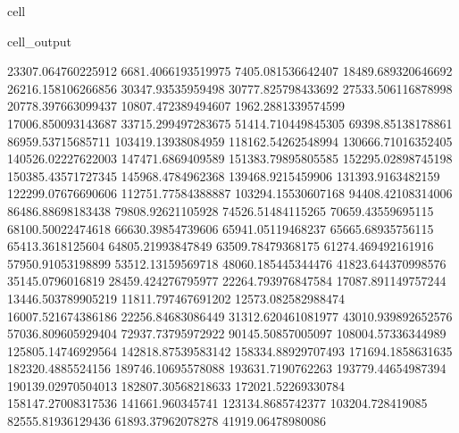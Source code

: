 \documentclass[letterpaper,10pt,english]{jupyterBook}
\begin{document}
\begin{sphinxuseclass}{cell}
\begin{sphinxVerbatimOutput}
\begin{sphinxuseclass}{cell_output}
\begin{sphinxVerbatim}[commandchars=\\\{\}]
23307.064760225912  6681.4066193519975  \PYGZhy{}7405.081536642407  \PYGZhy{}18489.689320646692  \PYGZhy{}26216.158106266856  \PYGZhy{}30347.93535959498  \PYGZhy{}30777.825798433692  \PYGZhy{}27533.506116878998  \PYGZhy{}20778.397663099437  \PYGZhy{}10807.472389494607  1962.2881339574599  17006.850093143687  33715.299497283675  51414.710449845305  69398.85138178861  86959.53715685711  103419.13938084959  118162.54262548994  130666.71016352405  140526.02227622003  147471.6869409589  151383.79895805585  152295.02898745198  150385.43571727345  145968.4784962368  139468.9215459906  131393.9163482159  122299.07676690606  112751.77584388887  103294.15530607168  94408.42108314006  86486.88698183438  79808.92621105928  74526.51484115265  70659.43559695115  68100.50022474618  66630.39854739606  65941.05119468237  65665.68935756115  65413.3618125604  64805.21993847849  63509.78479368175  61274.469492161916  57950.91053198899  53512.13159569718  48060.185445344476  41823.644370998576  35145.0796016819  28459.424276795977  22264.793976847584  17087.891149757244  13446.503789905219  11811.797467691202  12573.082582988474  16007.521674386186  22256.84683086449  31312.620461081977  43010.939892652576  57036.809605929404  72937.73795972922  90145.50857005097  108004.57336344989  125805.14746929564  142818.87539583142  158334.88929707493  171694.1858631635  182320.4885524156  189746.10695578088  193631.7190762263  193779.44654987394  190139.02970504013  182807.30568218633  172021.52269330784  158147.27008317536  141661.960345741  123134.8685742377  103204.728419085  82555.81936129436  61893.37962078278  41919.06478980086  

\end{sphinxVerbatim}
\end{sphinxuseclass}
\end{sphinxVerbatimOutput}
\end{sphinxuseclass}
\end{document}
